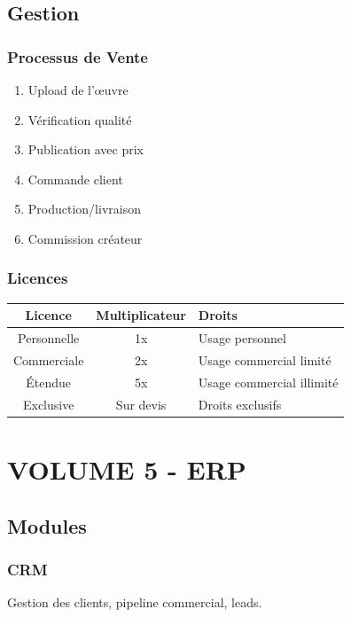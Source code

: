 \documentclass[12pt,a4paper,oneside]{book}
\begin{document}
\chapter{Gestion}

\section{Processus de Vente}
\begin{enumerate}
\item Upload de l'œuvre
\item Vérification qualité
\item Publication avec prix
\item Commande client
\item Production/livraison
\item Commission créateur
\end{enumerate}

\section{Licences}
\bigskip
\begin{center}
\begin{tabular}{|c|c|p{6cm}|}
\hline
\rowcolor{electronblue}
\color{white}\textbf{Licence} & \color{white}\textbf{Multiplicateur} & \color{white}\textbf{Droits} \\
\hline
Personnelle & 1x & Usage personnel \\
\hline
Commerciale & 2x & Usage commercial limité \\
\hline
Étendue & 5x & Usage commercial illimité \\
\hline
Exclusive & Sur devis & Droits exclusifs \\
\hline
\end{tabular}
\end{center}

\part{VOLUME 5 - ERP}

\chapter{Modules}

\section{CRM}
Gestion des clients, pipeline commercial, leads.
\end{document}

